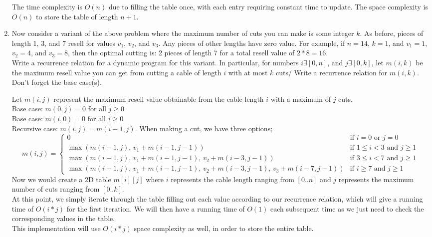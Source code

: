 \documentclass{article}
\begin{document}
\begin{enumerate}
The time complexity is $O(n)$ due to filling the table once, with each entry requiring constant time to update.
The space complexity is $O(n)$ to store the table of length $n + 1$.








\newpage
\item Now consider a variant of the above problem where the maximum number of cuts you can make is some integer $k$. As before, pieces of length 1, 3, and 7 resell for values $v_1$, $v_2$, and $v_3$. Any pieces of other lengths have zero value. For example, if $n=14$, $k=1$, and $v_1=1$, $v_2=4$, and $v_3=8$, then the optimal cutting is: 2 pieces of length 7 for a total resell value of $2*8=16$. \\
\newline
Write a recurrence relation for a dynamic program for this variant. In particular, for numbers $i \exists [0,n]$, and $j \exists [0,k]$, let $m(i,k)$ be the maximum resell value you can get from cutting a cable of length $i$ with at most $k$ cuts/ Write a recurrence relation for $m(i,k)$. Don't forget the base case(s).

Let $m(i,j)$ represent the maximum resell value obtainable from the cable length $i$ with a maximum of $j$ cuts. \\
\newline 
Base case: $m(0,j) = 0$ for all $j \geq 0$ \\
Base case: $m(i,0) = 0$ for all $i \geq 0$ \\
\newline 
Recursive case: $m(i,j) = m(i-1,j)$. When making a cut, we have three options; 
\[
m(i, j) = 
\begin{cases}
0 & \text{if } i = 0 \text{ or } j = 0 \\
\max \left( m(i-1, j), \, v_1 + m(i-1, j-1) \right) & \text{if } 1 \leq i < 3 \text{ and } j \geq 1 \\
\max \left( m(i-1, j), \, v_1 + m(i-1, j-1), \, v_2 + m(i-3, j-1) \right) & \text{if } 3 \leq i < 7 \text{ and } j \geq 1 \\
\max \left( m(i-1, j), \, v_1 + m(i-1, j-1), \, v_2 + m(i-3, j-1), \, v_3 + m(i-7, j-1) \right) & \text{if } i \geq 7 \text{ and } j \geq 1
\end{cases}
\]
Now we would create a 2D table $m[i][j]$ where $i$ represents the cable length ranging from $[0..n]$ and $j$ represents the maximum number of cuts ranging from $[0..k]$. \\
At this point, we simply iterate through the table filling out each value according to our recurrence relation, which will give a running time of $O(i*j)$ for the first iteration. We will then have a running time of $O(1)$ each subsequent time as we just need to check the corresponding values in the table. \\
This implementation will use $O(i*j)$ space complexity as well, in order to store the entire table.












\end{enumerate}
\end{document}
